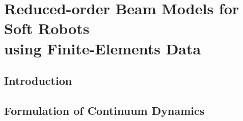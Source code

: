 \chapter[Harmonizing FEM and beam models]{Reduced-order Beam Models for Soft Robots \\ using Finite-Elements Data}
\label{chap: chapter 3}




\section{Introduction} \label{sec:chap1_introduction}


\section{Formulation of Continuum Dynamics} \label{sec:chap1_introduction}


